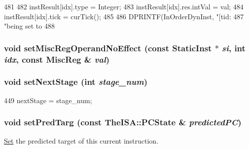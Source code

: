 \begin{DoxyCode}
481 {
482     instResult[idx].type = Integer;
483     instResult[idx].res.intVal = val;
484     instResult[idx].tick = curTick();
485 
486     DPRINTF(InOrderDynInst, "[tid:%
487             "being set to %
488 }
\end{DoxyCode}
\hypertarget{classInOrderDynInst_ab8932cf05609c698879f7ed97c0e1afa}{
\subsubsection[{setMiscRegOperandNoEffect}]{\setlength{\rightskip}{0pt plus 5cm}void setMiscRegOperandNoEffect (const {\bf StaticInst} $\ast$ {\em si}, \/  int {\em idx}, \/  const {\bf MiscReg} \& {\em val})}}
\label{classInOrderDynInst_ab8932cf05609c698879f7ed97c0e1afa}
\hypertarget{classInOrderDynInst_afda8644057fdd69ee5f1c323c6f6ce4f}{
\subsubsection[{setNextStage}]{\setlength{\rightskip}{0pt plus 5cm}void setNextStage (int {\em stage\_\-num})}}
\label{classInOrderDynInst_afda8644057fdd69ee5f1c323c6f6ce4f}



\begin{DoxyCode}
449 { nextStage = stage_num; }
\end{DoxyCode}
\hypertarget{classInOrderDynInst_a80e62e84695a013da86e43c7ed9ebeac}{
\subsubsection[{setPredTarg}]{\setlength{\rightskip}{0pt plus 5cm}void setPredTarg (const TheISA::PCState \& {\em predictedPC})}}
\label{classInOrderDynInst_a80e62e84695a013da86e43c7ed9ebeac}
\hyperlink{classSet}{Set} the predicted target of this current instruction. 


